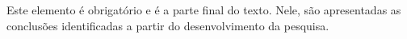 \documentclass[
        oneside,      %
        english,			
        brazil			 
        ]{abntbibufjf}
\begin{document}
Este elemento \'e obrigat\'orio e \'e a parte final do texto.  Nele, s\~ao apresentadas as conclus\~oes identificadas a partir do desenvolvimento da pesquisa.



\postextual 



\end{document}
